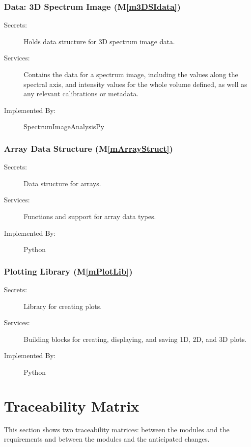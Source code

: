 \documentclass[12pt, titlepage]{article}
\newcommand{\mref}[1]{M\ref{#1}}
\newcommand{\progname}{SpectrumImageAnalysisPy}
\begin{document}
\subsubsection{Data: 3D Spectrum Image (\mref{m3DSIdata})}
\begin{description}
	\item[Secrets:]Holds data structure for 3D spectrum image data.
	\item[Services:]Contains the data for a spectrum image, including the values
along the spectral axis, and intensity values for the whole volume defined, as
well as any relevant calibrations or metadata.
	\item[Implemented By:] \progname
\end{description}

\subsubsection{Array Data Structure (\mref{mArrayStruct})}
\begin{description}
	\item[Secrets:]Data structure for arrays.
	\item[Services:]Functions and support for array data types.
	\item[Implemented By:] Python
\end{description}

\subsubsection{Plotting Library (\mref{mPlotLib})}
\begin{description}
	\item[Secrets:]Library for creating plots.
	\item[Services:]Building blocks for creating, displaying, and saving 1D, 2D,
    and 3D plots.
	\item[Implemented By:] Python
\end{description}

\section{Traceability Matrix} \label{SecTM}

This section shows two traceability matrices: between the modules and the
requirements and between the modules and the anticipated changes.
\end{document}
